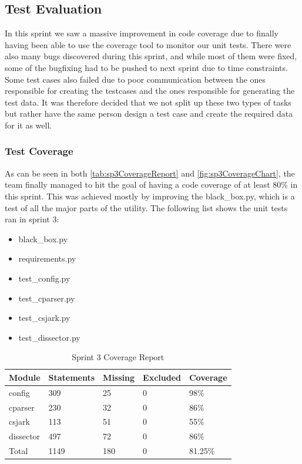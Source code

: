 \subsection{Test Evaluation}
In this sprint we saw a massive improvement in code coverage due to finally having been able to use the coverage tool to monitor our unit tests. There were also many bugs discovered during this sprint, and while most of them were fixed, some of the bugfixing had to be pushed to next sprint due to time constraints. Some test cases also failed due to poor communication between the ones responsible for creating the testcases and the ones responsible for generating the test data. It was therefore decided that we not split up these two types of tasks but rather have the same person design a test case and create the required data for it as well.

\subsubsection{Test Coverage}
As can be seen in both \autoref{tab:sp3CoverageReport} and \autoref{fig:sp3CoverageChart}, the team finally managed to hit the goal of having a code coverage of at least 80\% in this sprint. This was achieved mostly by improving the black\_box.py, which is a test of all the major parts of the \gls{utility}. The following list shows the unit tests ran in sprint 3:

\begin{itemize}
	\item black\_box.py
	\item requirements.py
	\item test\_config.py
	\item test\_cparser.py
	\item test\_csjark.py
	\item test\_dissector.py
\end{itemize}

\begin{table}[!htb]\footnotesize\center
	\caption{Sprint 3 Coverage Report\label{tab:sp3CoverageReport}}
	\begin{tabular}{l l l l l}
		\toprule
		Module & Statements & Missing & Excluded & Coverage\\
		\midrule
		config & 309 & 25 & 0 & 98\%\ \\
		cparser & 230 & 32 & 0 & 86\%\ \\
		csjark & 113 & 51 & 0 & 55\%\ \\
		dissector & 497 & 72 & 0 & 86\%\ \\
		Total & 1149 & 180  & 0 & 81.25\%\ \\
		\bottomrule
	\end{tabular}
\end{table}

